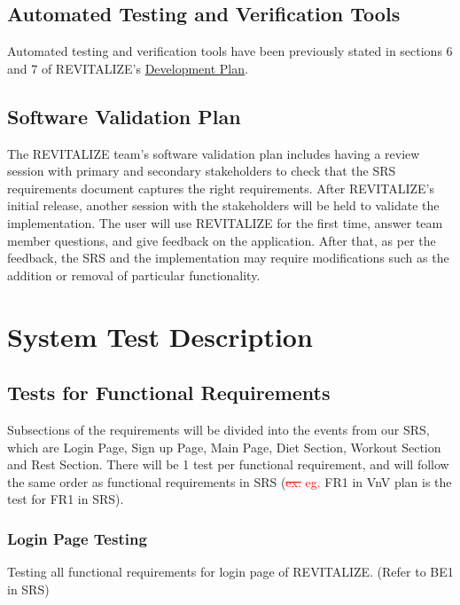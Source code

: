 \documentclass[12pt, titlepage]{article}
\begin{document}
\subsection{Automated Testing and Verification Tools}

Automated testing and verification tools have been previously stated in sections 6 and 7 of REVITALIZE's \href{https://github.com/BillNguyen1999/REVITALIZE/blob/main/docs/DevelopmentPlan/DevelopmentPlan.pdf}{\color{blue}Development Plan}.

\subsection{Software Validation Plan}

The REVITALIZE team's software validation plan includes having a review session with primary and secondary stakeholders to check that the SRS requirements document captures the right requirements. After REVITALIZE's initial release, another session with the stakeholders will be held to validate the implementation. The user will use REVITALIZE for the first time, answer team member questions, and give feedback on the application. After that, as per the feedback, the SRS and the implementation may require modifications such as the addition or removal of particular functionality.

\section{System Test Description}

\subsection{Tests for Functional Requirements}

Subsections of the requirements will be divided into the events from our SRS, which are Login Page, Sign up Page, Main Page, Diet Section, Workout Section and Rest Section. There will be 1 test per functional requirement, and will follow the same order as functional requirements in SRS (\textcolor{red}{\sout{ex.}} \textcolor{red}{eg.} FR1 in VnV plan is the test for FR1 in SRS).

\subsubsection{Login Page Testing}

Testing all functional requirements for login page of REVITALIZE. (Refer to BE1 in SRS)
\end{document}
